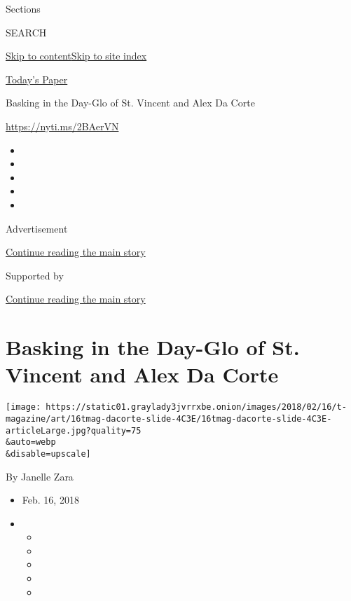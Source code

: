 Sections

SEARCH

\protect\hyperlink{site-content}{Skip to
content}\protect\hyperlink{site-index}{Skip to site index}

\href{https://myaccount.nytimes3xbfgragh.onion/auth/login?response_type=cookie\&client_id=vi}{}

\href{https://www.nytimes3xbfgragh.onion/section/todayspaper}{Today's
Paper}

Basking in the Day-Glo of St. Vincent and Alex Da Corte

\url{https://nyti.ms/2BAerVN}

\begin{itemize}
\item
\item
\item
\item
\item
\end{itemize}

Advertisement

\protect\hyperlink{after-top}{Continue reading the main story}

Supported by

\protect\hyperlink{after-sponsor}{Continue reading the main story}

\hypertarget{basking-in-the-day-glo-of-st-vincent-and-alex-da-corte}{%
\section{Basking in the Day-Glo of St. Vincent and Alex Da
Corte}\label{basking-in-the-day-glo-of-st-vincent-and-alex-da-corte}}

\texttt{[image: https://static01.graylady3jvrrxbe.onion/images/2018/02/16/t-magazine/art/16tmag-dacorte-slide-4C3E/16tmag-dacorte-slide-4C3E-articleLarge.jpg?quality=75\\\&auto=webp\\\&disable=upscale]}

By Janelle Zara

\begin{itemize}
\item
  Feb. 16, 2018
\item
  \begin{itemize}
  \item
  \item
  \item
  \item
  \item
  \end{itemize}
\end{itemize}

